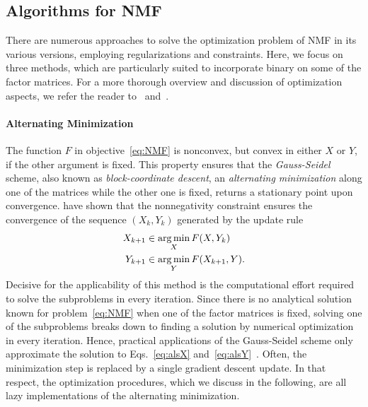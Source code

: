\subsection{Algorithms for NMF}\label{sec:ZS:algNMF}
There are numerous approaches to solve the optimization problem of NMF in its various versions, employing regularizations and constraints. Here, we focus on three methods, which are particularly suited to incorporate binary on some of the factor matrices. For a more thorough overview and discussion of optimization aspects, we refer the reader to~\cite{cichocki2009nonnegative} and~\cite{kim2014algorithms}.
%
\paragraph{Alternating Minimization}
The function $F$ in objective~\eqref{eq:NMF} is nonconvex, but convex in either $X$ or $Y$, if the other argument is fixed. This property ensures that the \emph{Gauss-Seidel} scheme, also known as \emph{block-coordinate descent}, an \emph{alternating minimization} along one of the matrices while the other one is fixed, returns a stationary point upon convergence. \cite{grippo2000convergence} have shown that the nonnegativity constraint ensures the convergence of the sequence $(X_k,Y_k)$ generated by the update rule
\begin{align}
X_{k+1} &\in \operatorname*{arg\,min}_{X} F(X,Y_k)\label{eq:alsX}\\
Y_{k+1} &\in \operatorname*{arg\,min}_{Y} F(X_{k+1},Y).\label{eq:alsY}
\end{align}
Decisive for the applicability of this method is the computational effort required to solve the subproblems in every iteration. Since there is no analytical solution known for problem~\eqref{eq:NMF} when one of the factor matrices is fixed, solving one of the subproblems breaks down to finding a solution by numerical optimization in every iteration.  Hence, practical applications of the Gauss-Seidel scheme only approximate the solution to Eqs.~\eqref{eq:alsX} and~\eqref{eq:alsY}~\citep{wang2013nonnegative}. Often, the minimization step is replaced by a single gradient descent update. In that respect, the optimization procedures, which we discuss in the following, are all lazy implementations of the alternating minimization.
%
